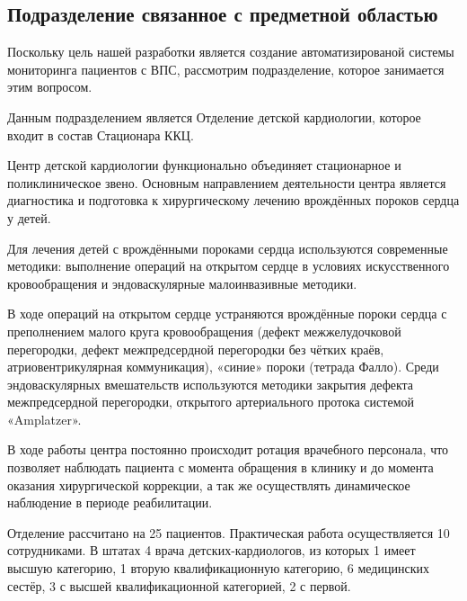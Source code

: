 \subsection{Подразделение связанное с предметной областью}

Поскольку цель нашей разработки является создание автоматизированой системы
мониторинга пациентов с ВПС, рассмотрим подразделение, которое занимается этим
вопросом.

Данным подразделением является Отделение детской кардиологии, которое входит в
состав Стационара ККЦ.

Центр детской кардиологии функционально объединяет стационарное и
поликлиническое звено. Основным направлением деятельности центра является
диагностика и подготовка к хирургическому лечению врождённых пороков сердца у
детей.

Для лечения детей с врождёнными пороками сердца  используются современные
методики:  выполнение  операций на открытом сердце в условиях искусственного
кровообращения  и эндоваскулярные малоинвазивные методики.

В ходе операций на открытом сердце устраняются врождённые пороки сердца с
преполнением малого круга кровообращения (дефект межжелудочковой перегородки,
дефект межпредсердной перегородки без чётких краёв, атриовентрикулярная
коммуникация), «синие» пороки (тетрада Фалло). Среди эндоваскулярных
вмешательств используются методики закрытия дефекта межпредсердной перегородки,
открытого артериального протока системой «Amplatzer».

В ходе работы центра постоянно происходит ротация врачебного персонала, что
позволяет наблюдать пациента с момента обращения в клинику и до момента оказания
хирургической коррекции, а так же осуществлять динамическое наблюдение в периоде
реабилитации.

Отделение рассчитано на 25 пациентов. Практическая работа осуществляется 10
сотрудниками. В штатах 4 врача детских-кардиологов, из которых 1 имеет высшую
категорию, 1 вторую квалификационную категорию, 6 медицинских сестёр, 3 с высшей
квалификационной категорией, 2 с первой.
